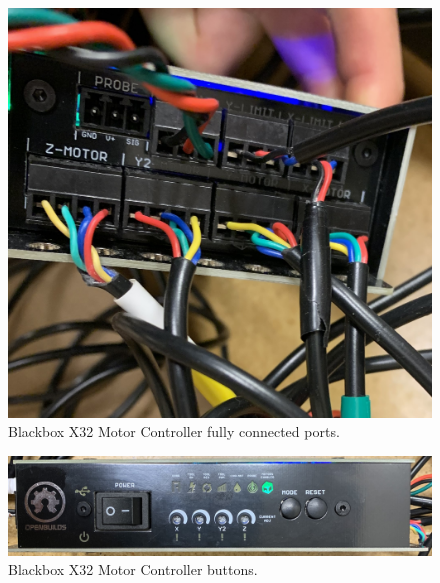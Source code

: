 \documentclass{article}
\begin{document}
\begin{outline}[enumerate]
    \begin{figure}
        \includegraphics[width=\linewidth]{../content/motor_controller_connections.jpg}
        \caption{Blackbox X32 Motor Controller fully connected ports.}
        \label{fig:controller2}
    \end{figure}

    \begin{figure}
        \includegraphics[width=\linewidth]{../content/motor_controller_buttons.jpg}
        \caption{Blackbox X32 Motor Controller buttons.}
        \label{fig:controller3}
    \end{figure}


\end{outline}
\end{document}
